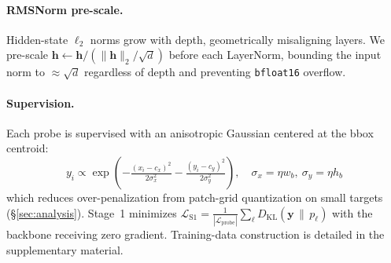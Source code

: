 \paragraph{RMSNorm pre-scale.}
Hidden-state $\ell_2$ norms grow with depth, geometrically misaligning layers. We pre-scale $\mathbf{h}\leftarrow\mathbf{h}/(\|\mathbf{h}\|_2/\sqrt{d})$ before each LayerNorm, bounding the input norm to ${\approx}\sqrt{d}$ regardless of depth and preventing \texttt{bfloat16} overflow.

\paragraph{Supervision.}
Each probe is supervised with an anisotropic Gaussian centered at the bbox centroid:
\begin{equation}
  y_i \propto \exp\!\left(-\tfrac{(x_i-c_x)^2}{2\sigma_x^2} - \tfrac{(y_i-c_y)^2}{2\sigma_y^2}\right),\quad \sigma_x=\eta w_b,\ \sigma_y=\eta h_b
  \label{eq:gaussian}
\end{equation}
which reduces over-penalization from patch-grid quantization on small targets (\S\ref{sec:analysis}). Stage~1 minimizes $\mathcal{L}_{\mathrm{S1}}=\tfrac{1}{|\mathcal{L}_{\mathrm{probe}}|}\sum_\ell D_{\mathrm{KL}}(\mathbf{y}\,\|\,p_\ell)$ with the backbone receiving zero gradient. Training-data construction is detailed in the supplementary material.
